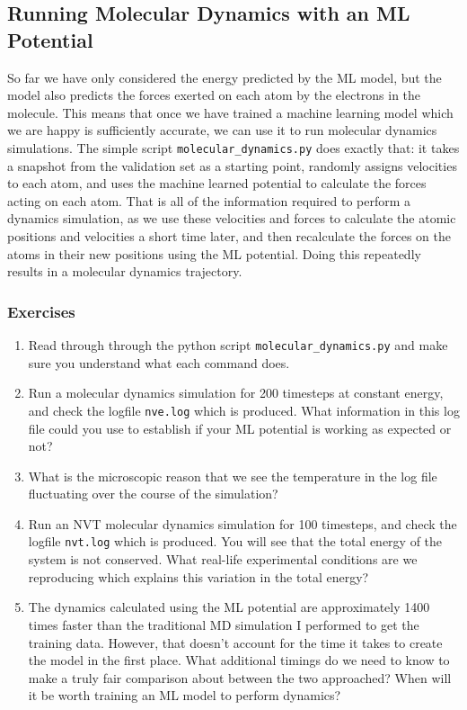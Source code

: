 \documentclass{article}
\begin{document}
\subsection{Running Molecular Dynamics with an ML Potential}
\label{sec:md}


So far we have only considered the energy predicted by the ML model, but the model also predicts the forces exerted on each atom by the electrons in the molecule. This means that once we have trained a machine learning model which we are happy is sufficiently accurate, we can use it to run molecular dynamics simulations. The simple script \verb|molecular_dynamics.py| does exactly that: it takes a snapshot from the validation set as a starting point, randomly assigns velocities to each atom, and uses the machine learned potential to calculate the forces acting on each atom. That is all of the information required to perform a dynamics simulation, as we use these velocities and forces to calculate the atomic positions and velocities a short time later, and then recalculate the forces on the atoms in their new positions using the ML potential. Doing this repeatedly results in a molecular dynamics trajectory.

\subsubsection*{Exercises}

\begin{enumerate}

\item Read through through the python script \verb|molecular_dynamics.py| and make sure you understand what each command does.
\item Run a molecular dynamics simulation for 200 timesteps at constant energy, and check the logfile \verb|nve.log| which is produced. What information in this log file could you use to establish if your ML potential is working as expected or not?
\item What is the microscopic reason that we see the temperature in the log file fluctuating over the course of the simulation?
\item Run an NVT molecular dynamics simulation for 100 timesteps, and check the logfile \verb|nvt.log| which is produced. You will see that the total energy of the system is not conserved. What real-life experimental conditions are we reproducing which explains this variation in the total energy?
\item The dynamics calculated using the ML potential are approximately 1400 times faster than the traditional MD simulation I performed to get the training data. However, that doesn't account for the time it takes to create the model in the first place. What additional timings do we need to know to make a truly fair comparison about between the two approached? When will it be worth training an ML model to perform dynamics?

\end{enumerate}
\end{document}

